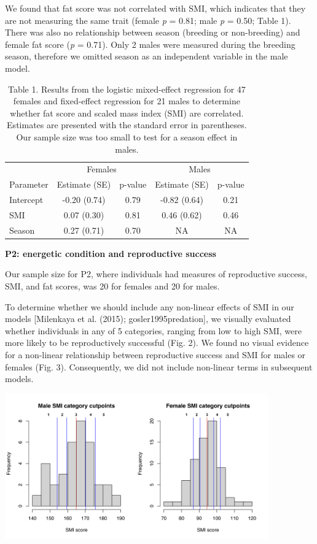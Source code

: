 \documentclass[
]{article}
\begin{document}
We found that fat score was not correlated with SMI, which indicates
that they are not measuring the same trait (female \emph{p} = 0.81; male
\emph{p} = 0.50; Table 1). There was also no relationship between season
(breeding or non-breeding) and female fat score (\emph{p} = 0.71). Only
2 males were measured during the breeding season, therefore we omitted
season as an independent variable in the male model.

\begin{table}

\caption{\label{tab:p1 results}Table 1. Results from the logistic mixed-effect regression for 47 females and fixed-effect regression for 21 males to determine whether fat score and scaled mass index (SMI) are correlated. Estimates are presented with the standard error in parentheses. Our sample size was too small to test for a season effect in males.}
\centering
\begin{tabular}[t]{l|c|c|c|c}
\hline
\multicolumn{1}{c|}{ } & \multicolumn{2}{c|}{Females} & \multicolumn{2}{c}{Males} \\
\cline{2-3} \cline{4-5}
Parameter & Estimate (SE) & p-value & Estimate (SE) & p-value\\
\hline
Intercept & -0.20 (0.74) & 0.79 & -0.82 (0.64) & 0.21\\
\hline
SMI & 0.07 (0.30) & 0.81 & 0.46 (0.62) & 0.46\\
\hline
Season & 0.27 (0.71) & 0.70 & NA & NA\\
\hline
\end{tabular}
\end{table}

\textbf{P2: energetic condition and reproductive success}

Our sample size for P2, where individuals had measures of reproductive
success, SMI, and fat scores, was 20 for females and 20 for males.

To determine whether we should include any non-linear effects of SMI in
our models {[}Milenkaya et al. (2015); gosler1995predation{]}, we
visually evaluated whether individuals in any of 5 categories, ranging
from low to high SMI, were more likely to be reproductively successful
(Fig. 2). We found no visual evidence for a non-linear relationship
between reproductive success and SMI for males or females (Fig. 3).
Consequently, we did not include non-linear terms in subsequent models.

\includegraphics[width=0.85\textwidth,height=\textheight]{gconditionfig2.jpg}
\end{document}
